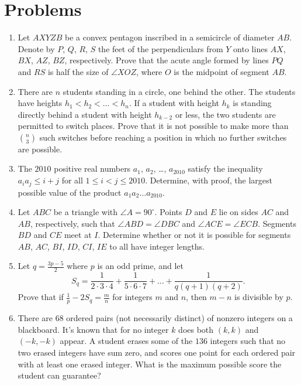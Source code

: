 \documentclass[11pt]{scrartcl}
\begin{document}
\section{Problems}
\begin{enumerate}[\bfseries 1.]
\item %
Let $AXYZB$ be a convex pentagon inscribed in a semicircle of diameter $AB$.
Denote by $P$, $Q$, $R$, $S$ the feet of the perpendiculars
from $Y$ onto lines $AX$, $BX$, $AZ$, $BZ$, respectively.
Prove that the acute angle formed by lines $PQ$ and $RS$
is half the size of $\angle XOZ$,
where $O$ is the midpoint of segment $AB$.

\item %
There are $n$ students standing in a circle, one behind the other.
The students have heights $h_1<h_2<\dots <h_n$.
If a student with height $h_k$ is standing directly
behind a student with height $h_{k-2}$ or less,
the two students are permitted to switch places.
Prove that it is not possible to make more than
$\binom{n}{3}$ such switches
before reaching a position in which no
further switches are possible.

\item %
The $2010$ positive real numbers $a_1$, $a_2$, \dots , $a_{2010}$
satisfy the inequality $a_i a_j \le i+j$
for all $1 \le i < j \le 2010$.
Determine, with proof, the largest possible value
of the product $a_1a_2\dots a_{2010}$.

\item %
Let $ABC$ be a triangle with $\angle A = 90^{\circ}$. Points $D$ and $E$ lie on sides $AC$ and $AB$, respectively, such that $\angle ABD = \angle DBC$ and $\angle ACE = \angle ECB$. Segments $BD$ and $CE$ meet at $I$. Determine whether or not it is possible for segments $AB$, $AC$, $BI$, $ID$, $CI$, $IE$ to all have integer lengths.

\item %
Let $q = \frac{3p-5}{2}$ where $p$ is an odd prime, and let
\[ S_q = \frac{1}{2\cdot 3 \cdot 4} + \frac{1}{5\cdot 6 \cdot 7}
+ \dots + \frac{1}{q(q+1)(q+2)}. \]
Prove that if $\frac{1}{p}-2S_q = \frac{m}{n}$ for integers $m$ and $n$,
then $m - n$ is divisible by $p$.

\item %
There are $68$ ordered pairs (not necessarily distinct)
of nonzero integers on a blackboard.
It's known that for no integer $k$ does both $(k,k)$ and $(-k,-k)$ appear.
A student erases some of the $136$ integers such that
no two erased integers have sum zero, and scores one point
for each ordered pair with at least one erased integer.
What is the maximum possible score the student can guarantee?

\end{enumerate}
\pagebreak
\end{document}
